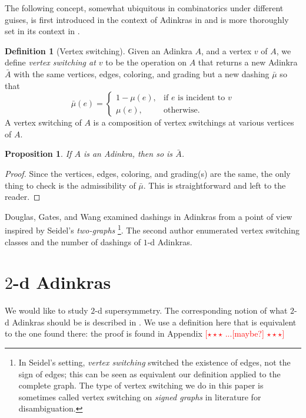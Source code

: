 \documentclass[12pt,twoside,singlespace]{article}
\numberwithin{equation}{section}
\newtheorem{prop}[equation]{Proposition}
\theoremstyle{definition}
\newtheorem{definition}[equation]{Definition}
\newcommand{\com}[1]{\textcolor{red}{$[\star \star \star$ #1 $\star \star \star]$}}
\begin{document}
The following concept, somewhat ubiquitous in combinatorics under different guises, is first introduced in the context of Adinkras in \cite{d2l:first} and is more thoroughly set in its context in \cite{dil:cohomology,zhang:adinkras}.

\begin{definition}[Vertex switching]
Given an Adinkra $A$, and a vertex $v$ of $A$, we define \emph{vertex switching at $v$} to be the operation on $A$ that returns a new Adinkra $\bar{A}$ with the same vertices, edges, coloring, and grading but a new dashing $\bar{\mu}$ so that
\begin{equation}
\bar{\mu}(e)=\begin{cases}
1-\mu(e),&\mbox{if $e$ is incident to $v$}\\
\mu(e),&\mbox{otherwise.}
\end{cases}
\end{equation}
A vertex switching of $A$ is a composition of vertex switchings at various vertices of $A$.
\end{definition}

\begin{prop}
\label{prop:switching-still-adinkra}
If $A$ is an Adinkra, then so is $\bar{A}$.
\end{prop}
\begin{proof}
Since the vertices, edges, coloring, and grading(s) are the same, the only thing to check is the admissibility of $\bar{\mu}$.  This is straightforward and left to the reader.
\end{proof}

Douglas, Gates, and Wang \cite{douglas} examined dashings in Adinkras from a point of view inspired by Seidel's \emph{two-graphs} \cite{seidel:survey} \footnote{In Seidel's setting, \emph{vertex switching} switched the existence of edges, not the sign of edges; this can be seen as equivalent our definition applied to the complete graph. The type of vertex switching we do in this paper is sometimes called vertex switching on \emph{signed graphs} in literature for disambiguation.}. The second author \cite{zhang:adinkras} enumerated vertex switching classes and the number of dashings of $1$-d Adinkras.

\section{$2$-d Adinkras}
\label{sec:2d}
We would like to study $2$-d supersymmetry. The corresponding notion of what $2$-d Adinkras should be is described in \cite{gates:dimensional_extension,hubsch:weaving}.  We use a definition here that is equivalent to the one found there: the proof is found in Appendix \com{...[maybe?]}
\end{document}
